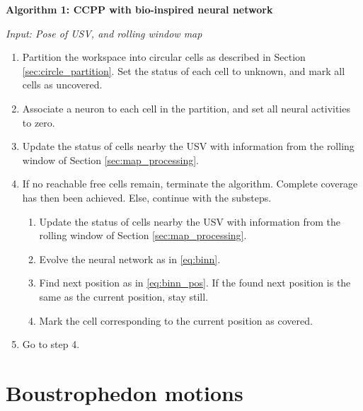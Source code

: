 \begin{tcolorbox}

\textbf{Algorithm 1: CCPP with bio-inspired neural network}

\emph{Input: Pose of USV, and rolling window map}

\begin{enumerate}
\itemsep0em

\item Partition the workspace into circular cells as described in Section \ref{sec:circle_partition}. Set the status of each cell to unknown, and mark all cells as uncovered.

\item Associate a neuron to each cell in the partition, and set all neural activities to zero.

\item Update the status of cells nearby the USV with information from the rolling window of Section \ref{sec:map_processing}.

\item If no reachable free cells remain, terminate the algorithm. Complete coverage has then been achieved. Else, continue with the substeps.
\begin{enumerate}
\itemsep0em

\item Update the status of cells nearby the USV with information from the rolling window of Section \ref{sec:map_processing}.

\item Evolve the neural network as in \eqref{eq:binn}.

\item Find next position as in \eqref{eq:binn_pos}. If the found next position is the same as the current position, stay still.

\item Mark the cell corresponding to the current position as covered.

\end{enumerate}

\item Go to step 4.

\end{enumerate}

\end{tcolorbox}


\section{Boustrophedon motions} \label{sec:ccpp_ba}

